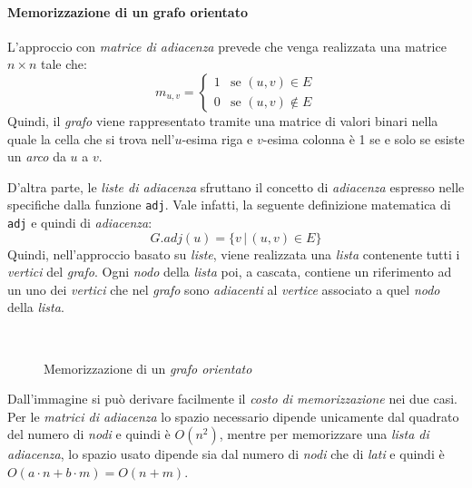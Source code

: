 \paragraph{Memorizzazione di un grafo orientato}
L'approccio con \emph{matrice di adiacenza} prevede che venga realizzata una
matrice $n\times n$ tale che:
\[m_{u,v}=\begin{cases}
    1 & \text{se } (u,v)\in E\\
    0 & \text{se } (u,v)\notin E
\end{cases}\]
Quindi, il \emph{grafo} viene rappresentato tramite una matrice di
valori binari nella quale la cella che si trova nell'$u$-esima riga e $v$-esima
colonna è 1 se e solo se esiste un \emph{arco} da $u$ a $v$.

D'altra parte, le \emph{liste di adiacenza} sfruttano il concetto di
\emph{adiacenza} espresso nelle specifiche dalla funzione \texttt{adj}. Vale
infatti, la seguente definizione matematica di \texttt{adj} e quindi di
\emph{adiacenza}:
\[G.adj(u)=\{v\,|\,(u,v)\in E\}\]
Quindi, nell'approccio basato su \emph{liste}, viene realizzata una \emph{lista}
contenente tutti i \emph{vertici} del \emph{grafo}. Ogni \emph{nodo} della
\emph{lista} poi, a cascata, contiene un riferimento ad un uno dei \emph{vertici}
che nel \emph{grafo} sono \emph{adiacenti} al \emph{vertice} associato a quel
\emph{nodo} della \emph{lista}.

\begin{figure}[h!]
    \centering
    \\
    \hfill
    \caption{Memorizzazione di un \emph{grafo orientato}}
\end{figure}\noindent
Dall'immagine si può derivare facilmente il \emph{costo di memorizzazione} nei
due casi. Per le \emph{matrici di adiacenza} lo spazio necessario dipende
unicamente dal quadrato del numero di \emph{nodi} e quindi è $O(n^2)$, mentre
per memorizzare una \emph{lista di adiacenza}, lo spazio usato dipende sia dal
numero di \emph{nodi} che di \emph{lati} e quindi è $O(a\cdot n+b\cdot m)=O(n+m)$.

